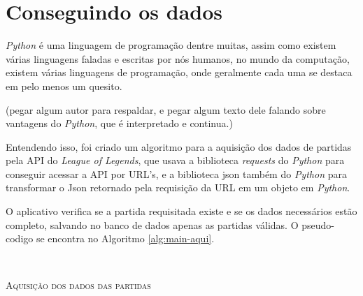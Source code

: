 \section{Conseguindo os dados}
\label{section:get}
\textit{Python} é uma linguagem de programação dentre muitas, assim como existem várias linguagens faladas e escritas por nós humanos, no mundo da computação, existem várias linguagens de programação, onde geralmente cada uma se destaca em pelo menos um quesito. 

(pegar algum autor para respaldar, e pegar algum texto dele falando sobre vantagens do \textit{Python}, que é interpretado e continua.)

Entendendo isso, foi criado um algoritmo para a aquisição dos dados de partidas pela API do \textit{League of Legends}, que usava a biblioteca \textit{requests} do \textit{Python} para conseguir acessar a API por URL's, e a biblioteca json também do \textit{Python} para transformar o Json retornado pela requisição da URL em um objeto em \textit{Python}.

O aplicativo verifica se a partida requisitada existe e se os dados necessários estão completo, salvando no banco de dados apenas as partidas válidas. O pseudo-codigo se encontra no Algoritmo \ref{alg:main-aqui}.

\


\begin{algorithm}[H]
   \SetAlgoLined
   \label{alg:main-aqui}
   \caption{\textsc{Aquisição dos dados das partidas}}
 \end{algorithm}

